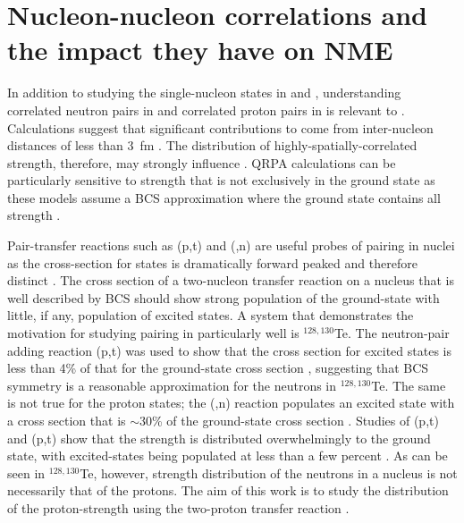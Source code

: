 \section{Nucleon-nucleon correlations and the impact they have on NME}
\label{sec:correlations}

In addition to studying the single-nucleon states in \GeTargets and \SeProducts, understanding correlated neutron pairs in  and correlated proton pairs in  is relevant to \NME.  Calculations suggest that significant contributions to \NME come from inter-nucleon distances of less than 3~fm \cite{anatomy}.  The distribution of highly-spatially-correlated \zp strength, therefore, may strongly influence \NME.  QRPA calculations can be particularly sensitive to \zp strength that is not exclusively in the ground state as these models assume a BCS approximation where the ground state contains all \zp strength \cite{BenderSCMF}. 

Pair-transfer reactions such as (p,t) and (,n) are useful probes of pairing in nuclei as the cross-section for \zp states is dramatically forward peaked and therefore distinct \cite{Yoshida}.  The cross section of a two-nucleon transfer reaction on a nucleus that is well described by BCS should show strong population of the \zp ground-state with little, if any, population of \zp excited states.  A system that demonstrates the motivation for studying pairing in  particularly well is $^{128,130}$Te.  The neutron-pair adding reaction (p,t) was used to show that the cross section for excited \zp states is less than 4\% of that for the ground-state \zp cross section \cite{neutronPairsTellurium}, suggesting that BCS symmetry is a reasonable approximation for the neutrons in $^{128,130}$Te.  The same is not true for the proton states; the (,n) reaction populates an excited \zp state with a cross section that is $\sim$30\% of the ground-state cross section \cite{protonPairsTellurium}.  Studies of (p,t) and (p,t) show that the \zp strength is distributed overwhelmingly to the ground state, with excited-\zp states being populated at less than a few percent \cite{neutronPairsGermanium}.  As can be seen in $^{128,130}$Te, however, \zp strength distribution of the neutrons in a nucleus is not necessarily that of the protons.  The aim of this work is to study the distribution of the proton-\zp strength using the two-proton transfer reaction \reaction.   

